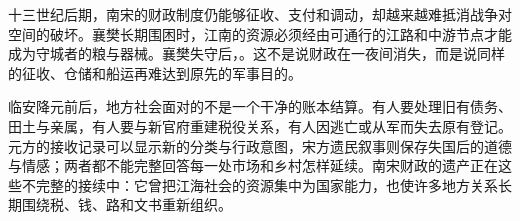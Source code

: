 十三世纪后期，南宋的财政制度仍能够征收、支付和调动，却越来越难抵消战争对空间的破坏。襄樊长期围困时，江南的资源必须经由可通行的江路和中游节点才能成为守城者的粮与器械。襄樊失守后，。这不是说财政在一夜间消失，而是说同样的征收、仓储和船运再难达到原先的军事目的。

临安降元前后，地方社会面对的不是一个干净的账本结算。有人要处理旧有债务、田土与亲属，有人要与新官府重建税役关系，有人因逃亡或从军而失去原有登记。元方的接收记录可以显示新的分类与行政意图，宋方遗民叙事则保存失国后的道德与情感；两者都不能完整回答每一处市场和乡村怎样延续。南宋财政的遗产正在这些不完整的接续中：它曾把江海社会的资源集中为国家能力，也使许多地方关系长期围绕税、钱、路和文书重新组织。
